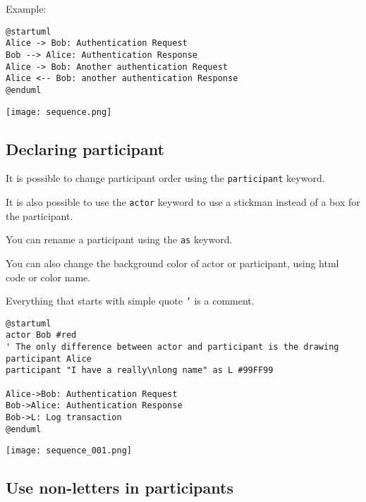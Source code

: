 Example:

\begin{lstlisting}
@startuml
Alice -> Bob: Authentication Request
Bob --> Alice: Authentication Response
Alice -> Bob: Another authentication Request
Alice <-- Bob: another authentication Response
@enduml
\end{lstlisting}

\begin{center}
\texttt{[image: sequence.png]}
\end{center}


\newpage \subsection{Declaring participant}

\begin{description}

\item It is possible to change participant order using the \texttt{participant} keyword.
\item It is also possible to use the \texttt{actor} keyword to use a stickman instead of a box for the participant.

\item You can rename a participant using the \texttt{as} keyword.

\item You can also change the background color of actor or participant, using html code or color name.

\item Everything that starts with simple quote \texttt{'} is a comment. 
\end{description}

\begin{lstlisting}
@startuml
actor Bob #red
' The only difference between actor and participant is the drawing
participant Alice
participant "I have a really\nlong name" as L #99FF99

Alice->Bob: Authentication Request
Bob->Alice: Authentication Response
Bob->L: Log transaction
@enduml
\end{lstlisting}

\begin{center}
\texttt{[image: sequence\_001.png]}
\end{center}


\newpage \subsection{Use non-letters in participants}

